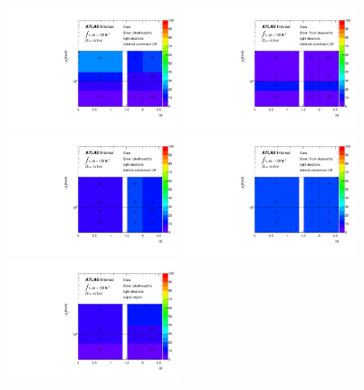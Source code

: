 \begin{figure}[p!]
  \begin{center}
  \includegraphics[width=0.45\textwidth]{figures/qmisid/syst_Data_Likelihood_tight_extcr}
  \includegraphics[width=0.45\textwidth]{figures/qmisid/syst_Data_Truthclosure_tight_extcr}\\
  \includegraphics[width=0.45\textwidth]{figures/qmisid/syst_Data_Likelihood_tight_intcr}
  \includegraphics[width=0.45\textwidth]{figures/qmisid/syst_Data_Truthclosure_tight_intcr}\\
  \includegraphics[width=0.45\textwidth]{figures/qmisid/syst_Data_Likelihood_tight_sr}

\end{center}
\end{figure}
